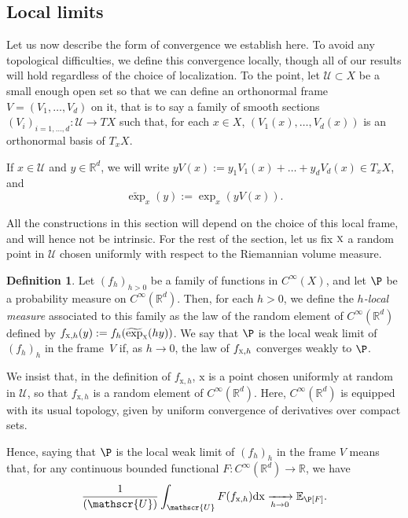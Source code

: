 \documentclass[10pt]{amsart}
\let\mathcal\mathscr
\newcommand{\NoChangel}[1]{%
\expandafter\let\csname old\string#1\endcsname=#1
\let#1=\relax
\newcommand{#1}{\mathcode`l="716C\csname old\string#1\endcsname\mathcode`l="7160 }%
}
\theoremstyle{plain}
\theoremstyle{definition}
\newtheorem{definition}[theorem]{Definition}
\newcommand{\R}{\mathbb{R}}
\def\calU{\mathcal{U}}
\DeclareMathOperator{\Vol}{Vol}\NoChangel{\Vol}
\begin{document}
\subsection{Local limits}\label{ss:local_limits_def}

Let us now describe the form of convergence we establish here. To avoid any topological difficulties, we define this convergence locally, though all of our results will hold regardless of the choice of localization. To the point, let $\mathcal{U}\subset X$ be a small enough open set so that we can define an orthonormal frame $V=(V_1,\dots,V_d)$ on it, that is to say a family of smooth sections $(V_i)_{i=1,\dots,d} : \mathcal{U}\to TX$ such that, for each $x\in X$, $(V_1(x),\dots,V_d(x))$ is an orthonormal basis of $T_xX$.

If $x\in \mathcal{U}$ and $y\in \R^d$, we will write $yV(x) := y_1 V_1(x)+\dots+y_d V_d(x) \in T_xX$, and
\begin{equation}\label{eq:JamesBrownIsTheBest}
\widetilde{\exp}_{x}(y) := \exp_x (yV(x)).
\end{equation}

All the constructions in this section will depend on the choice of this local frame, and will hence not be intrinsic. For the rest of the section, let us fix $\textsc{x}$ a random point in $\calU$ chosen uniformly with respect to the Riemannian volume measure.
\begin{definition}
Let $(f_h)_{h>0}$ be a family of functions in $C^\infty(X)$, and let $\P$ be a probability measure on $C^\infty(\R^d)$. Then, for each $h>0$, we define the \emph{$h$-local measure} associated to this family as the law of the random element of $C^\infty(\R^d)$ defined by $f_{\textsc{x},h}(y):=f_h(\widetilde{\exp}_{\textsc{x}}(hy))$. We say that $\P$ is the local weak limit of $(f_h)_h$ in the frame~$V$ if, as $h\to 0$, the law of $f_{\textsc{x},h}$ converges weakly to $\P$.
\end{definition}

We insist that, in the definition of $f_{\mathrm{x},h}$, $\mathrm{x}$ is a point chosen uniformly at random in $\mathcal{U}$, so that $f_{\mathrm{x},h}$ is a random element of $C^{\infty}(\R^d)$. Here, $C^\infty(\R^d)$ is equipped with its usual topology, given by uniform convergence of derivatives over compact sets.

Hence, saying that $\P$ is the local weak limit of $(f_h)_h$ in the frame $V$ means that, for any continuous bounded functional $F: C^\infty(\R^d) \to \R$, we have
\[
\frac{1}{\Vol(\mathcal{U})} \int_\mathcal{U} F (f_{\mathrm{x},h})\mathrm{dx} \xrightarrow[h \to 0]{} \mathbb{E}_\P [F].
\]
\end{document}
